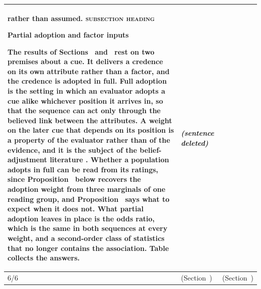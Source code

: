 \documentclass[10pt]{article}
\theoremstyle{definition}
\renewcommand{\ref}[1]{\textsc{\detokenize{#1}}}
\begin{document}
{\begin{longtable}{|p{0.9cm}|p{12.2cm}|p{12.2cm}|}
rather than assumed. \textsc{subsection heading}\par\textbf{\large Partial adoption and factor inputs}\par  \par The results of Sections~\ref{sec:individual} and~\ref{sec:aggregation} rest on two premises about a cue. It delivers a credence on its own attribute rather than a factor, and the credence is adopted in full. Full adoption is the setting in which an evaluator adopts a cue alike whichever position it arrives in, so that the sequence can act only through the believed link between the attributes. A weight on the later cue that depends on its position is a property of the evaluator rather than of the evidence, and it is the subject of the belief-adjustment literature \citep{HogarthEinhorn1992}. Whether a population adopts in full can be read from its ratings, since Proposition~\ref{prop:ADJ} below recovers the adoption weight from three marginals of one reading group, and Proposition~\ref{prop:LAD} says what to expect when it does not. What partial adoption leaves in place is the odds ratio, which is the same in both sequences at every weight, and a second-order class of statistics that no longer contains the association. Table~\ref{tab:robust} collects the answers. & \textit{(sentence deleted)} \\ \hline
6/6 & (Section~\ref{sec:robust}) & (Section~\ref{sec:scope}) \\ \hline

\end{longtable}}
\end{document}

